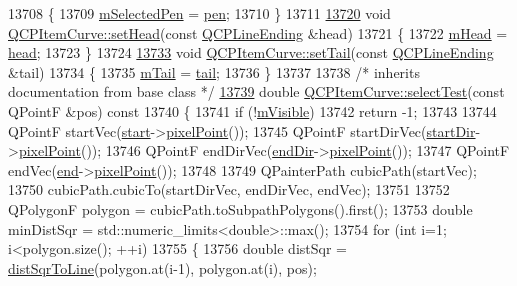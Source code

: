 \begin{DoxyCode}
13708 \{
13709   \hyperlink{a00034_ab22cbab261b20be5aa8e4ca252149246}{mSelectedPen} = \hyperlink{a00034_abc6321e55a9ba1a0c7df407843dfa252}{pen};
13710 \}
13711 
\hypertarget{a00115_source_l13720}{}\hyperlink{a00034_a08a30d9cdd63995deea3d9e20430676f}{13720} \textcolor{keywordtype}{void} \hyperlink{a00034_a08a30d9cdd63995deea3d9e20430676f}{QCPItemCurve::setHead}(\textcolor{keyword}{const} \hyperlink{a00046}{QCPLineEnding} &head)
13721 \{
13722   \hyperlink{a00034_af2cc26ff199570940dc96f5ec19a13f8}{mHead} = \hyperlink{a00034_afc067f0d1e60cd04812f2c2c7fdf36c3}{head};
13723 \}
13724 
\hypertarget{a00115_source_l13733}{}\hyperlink{a00034_ac3488d8b1a6489c845dc5bff3ef71124}{13733} \textcolor{keywordtype}{void} \hyperlink{a00034_ac3488d8b1a6489c845dc5bff3ef71124}{QCPItemCurve::setTail}(\textcolor{keyword}{const} \hyperlink{a00046}{QCPLineEnding} &tail)
13734 \{
13735   \hyperlink{a00034_af1dca285b97e3f5b892dab827a79f327}{mTail} = \hyperlink{a00034_a9adddfcc5275be0cf27e3c0c31c37c1a}{tail};
13736 \}
13737 
13738 \textcolor{comment}{/* inherits documentation from base class */}
\hypertarget{a00115_source_l13739}{}\hyperlink{a00034_ae54055ee1070735155166ecb887a9316}{13739} \textcolor{keywordtype}{double} \hyperlink{a00034_ae54055ee1070735155166ecb887a9316}{QCPItemCurve::selectTest}(\textcolor{keyword}{const} QPointF &pos)\textcolor{keyword}{ const}
13740 \textcolor{keyword}{}\{
13741   \textcolor{keywordflow}{if} (!\hyperlink{a00044_a62e3aed8427d6ce3ccf716f285106cb3}{mVisible})
13742     \textcolor{keywordflow}{return} -1;
13743   
13744   QPointF startVec(\hyperlink{a00034_a20c3b5ea31c33764f4f30c2ec7ae518b}{start}->\hyperlink{a00038_ae490f9c76ee2ba33752c495d3b6e8fb5}{pixelPoint}());
13745   QPointF startDirVec(\hyperlink{a00034_aa124bf66c09cc51c627fb49db8bf8a7b}{startDir}->\hyperlink{a00038_ae490f9c76ee2ba33752c495d3b6e8fb5}{pixelPoint}());
13746   QPointF endDirVec(\hyperlink{a00034_a28181a9dee9cc3c3da83a883221bd2d0}{endDir}->\hyperlink{a00038_ae490f9c76ee2ba33752c495d3b6e8fb5}{pixelPoint}());
13747   QPointF endVec(\hyperlink{a00034_a24ecbb195b32a08b42b61c2cf08a1b4d}{end}->\hyperlink{a00038_ae490f9c76ee2ba33752c495d3b6e8fb5}{pixelPoint}());
13748 
13749   QPainterPath cubicPath(startVec);
13750   cubicPath.cubicTo(startDirVec, endDirVec, endVec);
13751   
13752   QPolygonF polygon = cubicPath.toSubpathPolygons().first();
13753   \textcolor{keywordtype}{double} minDistSqr = std::numeric\_limits<double>::max();
13754   \textcolor{keywordflow}{for} (\textcolor{keywordtype}{int} i=1; i<polygon.size(); ++i)
13755   \{
13756     \textcolor{keywordtype}{double} distSqr = \hyperlink{a00022_acdca343717d625b8abb3c3e38c0ed39d}{distSqrToLine}(polygon.at(i-1), polygon.at(i), pos);

\end{DoxyCode}
